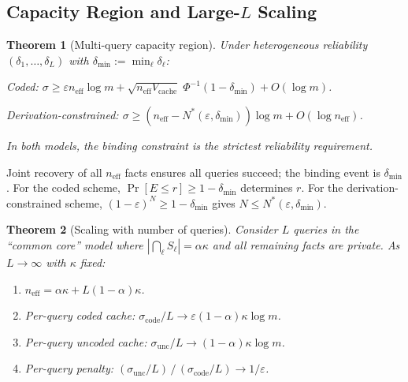 \documentclass[journal]{IEEEtran}
\makeatletter
\newtheorem{theorem}{Theorem}[section]
\numberwithin{equation}{section}
\renewenvironment{proof}[1][\proofname]{\par
  \pushQED{\qed}%
  \normalfont \topsep6\p@\@plus6\p@\relax
  \trivlist
  \item[\hskip\labelsep
        \itshape
    #1\@addpunct{.}]\ignorespaces
}{%
  \popQED\endtrivlist\@endpefalse
}
\makeatother
\begin{document}
\subsection{\texorpdfstring{Capacity Region and Large-$L$ Scaling}{Capacity Region and Large-L Scaling}}
\label{subsec:mq-scaling}

\begin{theorem}[Multi-query capacity region]
\label{thm:capacity-region-mq}
Under heterogeneous reliability
$(\delta_1,\ldots,\delta_L)$ with
$\delta_{\min}:=\min_\ell\delta_\ell$:

\noindent\emph{Coded:}\;
$\sigma\ge\varepsilon n_{\mathrm{eff}}\log m
+\sqrt{n_{\mathrm{eff}}V_{\mathrm{cache}}}\;
\Phi^{-1}(1{-}\delta_{\min})+O(\log m)$.

\noindent\emph{Derivation-constrained:}\;
$\sigma\ge(n_{\mathrm{eff}}{-}N^*(\varepsilon,\delta_{\min}))\log m
+O(\log n_{\mathrm{eff}})$.

\noindent
In both models, the binding constraint is the strictest
reliability requirement.
\end{theorem}

\begin{proof}
Joint recovery of all $n_{\mathrm{eff}}$ facts ensures all
queries succeed; the binding event is
$\delta_{\min}$.
For the coded scheme,
$\Pr[E\le r]\ge 1{-}\delta_{\min}$ determines $r$.
For the derivation-constrained scheme,
$(1{-}\varepsilon)^N\ge 1{-}\delta_{\min}$ gives
$N\le N^*(\varepsilon,\delta_{\min})$.
\end{proof}

\begin{theorem}[Scaling with number of queries]
\label{thm:large-L-mq}
Consider $L$ queries in the ``common core'' model where
$|\bigcap_\ell S_\ell|=\alpha\kappa$ and all remaining
facts are private.
As $L\to\infty$ with $\kappa$ fixed:
\begin{enumerate}[label=\textup{(\Roman*)}]
\item $n_{\mathrm{eff}}
=\alpha\kappa+L(1{-}\alpha)\kappa$.

\item \emph{Per-query coded cache:}\;
$\sigma_{\mathrm{code}}/L
\to\varepsilon(1{-}\alpha)\kappa\log m$.

\item \emph{Per-query uncoded cache:}\;
$\sigma_{\mathrm{unc}}/L
\to(1{-}\alpha)\kappa\log m$.

\item \emph{Per-query penalty:}\;
$(\sigma_{\mathrm{unc}}/L)\,/\,
(\sigma_{\mathrm{code}}/L)\to 1/\varepsilon$.
\end{enumerate}
\end{theorem}
\end{document}
